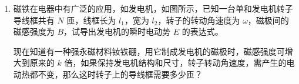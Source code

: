 \documentclass[\gkver]{gaokaozhenti}
\begin{document}
\begin{enumerate}
{$p'S+F=p_{0}S+k(2l-l_{0})$ ③

由①、②、③联立解得

$p=\frac{2(F-kl)}{S}$ ④

由式得

$l_{0}=l+\frac{S}{k}(p_{0}-p)$ ⑤

当 $F=500\UN$ 时，由④式得 $p=0.4p_{0}$，再代入⑤式得 $l_{0}=1.50\Um$，可见在整个过程中弹簧始终处于压缩状态。

当 $F=700\UN$ 时，由④式得 $p=0.8p_{0}$，再代入⑤式得 $l_{0}=0.833\Um$，可见在过程开始时弹簧处于压缩状态，当活塞提高到距缸底距离超过 $l_{0}=0.833\Um$ 后，弹簧被拉伸。

评分标准：本题共 28 分。正确求出 $l_{0}$ 的两个结果。

参考解答二：

设开始时弹簧的压缩量为 $x$（当得出 $x$ 为负值时，表示开始时弹簧被拉长），原长为 $l_{0}$。

依题意得方程：

$p_{0}S=pS+kx$ ①

$p_{0}S=p'S-k(l_{0}-2x)+F$ ②

$p'S\cdot2(l_{0}-x)=pS(l_{0}-x)$ ③

$l_{0}=l+x$ ④

由①、②、③、④式联立，解得

$x=\frac{p_{0}S-2F+2kl}{k}$ ⑤

当 $F=500\UN$ 时，代入⑤式，得 $x=1.00\Um$，$l_{0}=1.50\Um$。

当 $F=700\UN$ 时，代入⑤式，得 $x=0.333\Um$，$l_{0}=0.833\Um$。

（用其他解法，正确列出公式，并正确求得 $l_{0}$ 值，同样给分。）

}

\item
磁铁在电器中有广泛的应用，如发电机，如图所示，已知一台单和发电机转子导线框共有 $N$ 匝，线框长为 $l_{1}$，宽为 $l_{2}$，转子的转动角速度为 $\omega$，磁极间的磁感强度为 $B$，试导出发电机的瞬时电动势 $E$ 的表达式。

现在知道有一种强永磁材料钕铁硼，用它制成发电机的磁极时，磁感强度可增大到原来的 $k$ 倍，如果保持发电机结构和尺寸，转子转动角速度，需产生的电动热都不变，那么这时转子上的导线框需要多少匝？
\end{enumerate}
\end{document}
